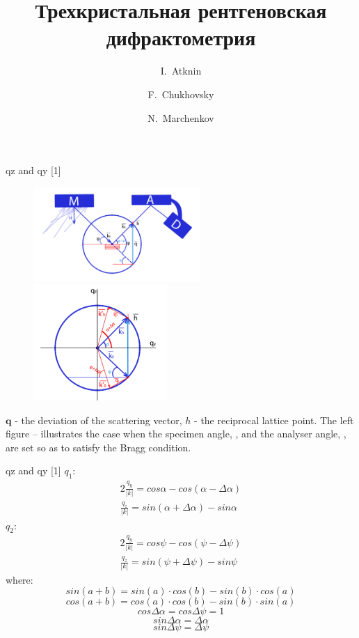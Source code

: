 \documentclass{beamer}
\title[Triple crystal difractometry] %
{Трехкристальная рентгеновская дифрактометрия}
\author[Atknin, Chukhovsky, Marchenkov ] 
{I.~Atknin\inst{1,2,3} \and F.~Chukhovsky\inst{2} \and N.~Marchenkov\inst{2,3}}
\institute[] %
{
  \inst{1}%
  Department of optics, spectroskopy and physics of nanosystems\\
  Moscow State University
  \and
  \inst{2}%
X-ray analysis technique and
synchrotron radiation laboratory\\
 Shubnikov Institute of Crystallography, Russian Academy of Sciences.
  \and
  \inst{3}%
  National Research Centre "Kurchatov Institute"\\
 Department of Nano-, Bio-, Info-, and Cognitive Sciences and Technologies}
\date[\today ] %
\begin{document}
\begin{frame}
  \titlepage
\end{frame}


\begin{frame}{qz and qy [1]}
\begin{figure}[h] 
   \centering
   \includegraphics[width=2.5in]{graph/ewald_general.png} 
   \includegraphics[width=2.0in]{graph/ewald_help.png} 
   \label{default}
\end{figure}
$\pmb q$ - the deviation of the scattering vector,
$h$ - the reciprocal lattice point.
The left figure – illustrates the case when the specimen angle, \fbox{$\psi$}, and the analyser angle, \fbox{$\phi$}, are set so as to satisfy the Bragg condition.
\end{frame}


\begin{frame}{qz and qy  [1]}
$q_1:$
\begin{alignat}{2}
\frac{q_y}{|k|} = cos\alpha -  cos(\alpha - \Delta \alpha) \\
\frac{q_z}{|k|} = sin(\alpha + \Delta \alpha) -  sin\alpha 
\end{alignat}
$q_2:$
\begin{alignat}{2}
\frac{q_y}{|k|} = cos\psi -  cos(\psi - \Delta \psi) \\
\frac{q_z}{|k|} = sin(\psi + \Delta \psi) -  sin\psi 
\end{alignat}
where:
$$ sin(a + b) = sin (a) \cdot cos (b)  - sin (b)  \cdot cos (a)  $$
$$ cos(a + b) = cos (a) \cdot cos (b)  - sin (b)  \cdot sin (a)  $$
$$cos  \Delta \alpha  = cos \Delta \psi = 1 $$
$$sin  \Delta \alpha  = \Delta \alpha $$
$$sin \Delta \psi =  \Delta \psi$$
\end{frame}
\end{document}
